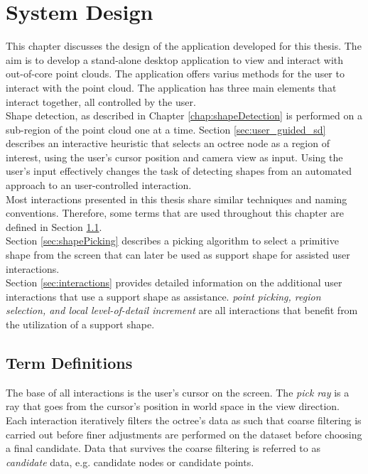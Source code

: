 \chapter{System Design}
\label{chap:systemDesign}

This chapter discusses the design of the application developed for this thesis. The aim is to develop a stand-alone desktop application to view and interact with out-of-core point clouds. The application offers varius methods for the user to interact with the point cloud. The application has three main elements that interact together, all controlled by the user. 
\\
Shape detection, as described in Chapter \ref{chap:shapeDetection} is performed on a sub-region of the point cloud one at a time. Section \ref{sec:user_guided_sd} describes an interactive heuristic that selects an octree node as a region of interest, using the user's cursor position and camera view as input. Using the user's input effectively changes the task of detecting shapes from an automated approach to an user-controlled interaction.
\\
Most interactions presented in this thesis share similar techniques and naming conventions. Therefore, some terms that are used throughout this chapter are defined in Section \ref{sec:termDefinitions}. 
\\
Section \ref{sec:shapePicking} describes a picking algorithm to select a primitive shape from the screen that can later be used as support shape for assisted user interactions. 
\\
Section \ref{sec:interactions} provides detailed information on the additional user interactions that use a support shape as assistance. \textit{point picking, region selection, and local level-of-detail increment} are all interactions that benefit from the utilization of a support shape. 


\section{Term Definitions}
\label{sec:termDefinitions}

The base of all interactions is the user's cursor on the screen. The \textit{pick ray} is a ray that goes from the cursor’s position in world space in the view direction. 
Each interaction iteratively filters the octree's data as such that coarse filtering is carried out before finer adjustments are performed on the dataset before choosing a final candidate. Data that survives the coarse filtering is referred to as \textit{candidate} data, e.g. candidate nodes or candidate points. 


